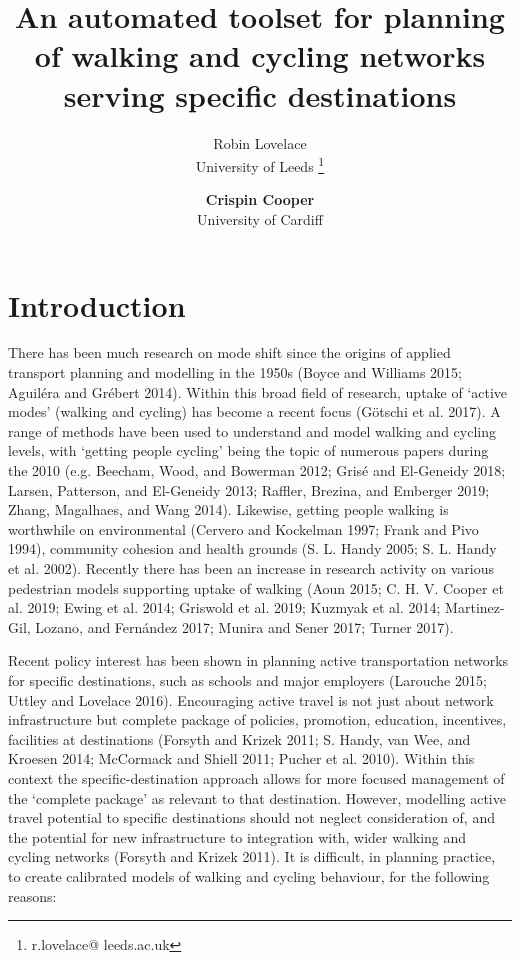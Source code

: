 \documentclass[galley]{jtlu-article-2col}
\title{An automated toolset for planning of walking and cycling networks serving specific destinations}
\author{{\semibfsf Robin Lovelace  } \\University of Leeds  \thanks{r.lovelace@ leeds.ac.uk}
  \and {\bfseries Crispin Cooper} \\University of Cardiff
}%
\date{} %
\begin{document}
\saythanks

\onecolumn

\hypertarget{introduction}{%
\section{Introduction}\label{introduction}}

There has been much research on mode shift since the origins of applied transport planning and modelling in the 1950s (Boyce and Williams 2015; Aguiléra and Grébert 2014). Within this broad field of research, uptake of `active modes' (walking and cycling) has become a recent focus (Götschi et al. 2017). A range of methods have been used to understand and model walking and cycling levels, with `getting people cycling' being the topic of numerous papers during the 2010 (e.g. Beecham, Wood, and Bowerman 2012; Grisé and El-Geneidy 2018; Larsen, Patterson, and El-Geneidy 2013; Raffler, Brezina, and Emberger 2019; Zhang, Magalhaes, and Wang 2014).
Likewise, getting people walking is worthwhile on environmental (Cervero and Kockelman 1997; Frank and Pivo 1994), community cohesion and health grounds (S. L. Handy 2005; S. L. Handy et al. 2002).
Recently there has been an increase in research activity on various pedestrian models supporting uptake of walking (Aoun 2015; C. H. V. Cooper et al. 2019; Ewing et al. 2014; Griswold et al. 2019; Kuzmyak et al. 2014; Martinez-Gil, Lozano, and Fernández 2017; Munira and Sener 2017; Turner 2017).

Recent policy interest has been shown in planning active transportation networks for specific destinations, such as schools and major employers (Larouche 2015; Uttley and Lovelace 2016).
Encouraging active travel is not just about network infrastructure but complete package of policies, promotion, education, incentives, facilities at destinations (Forsyth and Krizek 2011; S. Handy, van Wee, and Kroesen 2014; McCormack and Shiell 2011; Pucher et al. 2010).
Within this context the specific-destination approach allows for more focused management of the `complete package' as relevant to that destination.
However, modelling active travel potential to specific destinations should not neglect consideration of, and the potential for new infrastructure to integration with, wider walking and cycling networks (Forsyth and Krizek 2011).
It is difficult, in planning practice, to create calibrated models of walking and cycling behaviour, for the following reasons:
\end{document}

